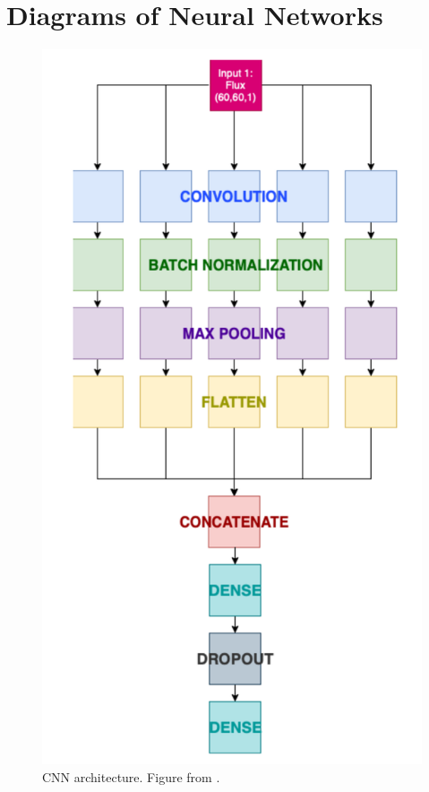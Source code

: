 \chapter{Diagrams of Neural Networks}
\label{app:NN_Architecture}
\begin{figure}[h!]
    \centering
    \includegraphics[height=.4\pdfpageheight]{figures/EddieCNN.png}
    \caption{CNN architecture. Figure from \textcite{Sepeku2022}.}
    \label{fig:Sepeku2022_CNN}
\end{figure}

